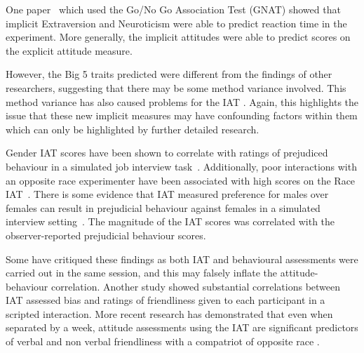 

One paper~\cite{Boldero2007} which used the Go/No Go Association Test (GNAT) showed that implicit Extraversion and Neuroticism were able to predict reaction time in the experiment. More generally, the implicit attitudes were able to predict scores on the explicit attitude measure. 

However, the Big 5 traits predicted were different from the findings of other researchers, suggesting that there may be some method variance involved. This method variance has also caused problems for the IAT \cite{Mierke2003,Greenwald2003a}. Again, this highlights the issue that these new implicit measures may have confounding factors within them which can only be highlighted by further detailed research.



Gender IAT scores have been shown to correlate with ratings of prejudiced behaviour in a simulated job interview task~\cite{Rudman1999a}. Additionally, poor interactions with an opposite race experimenter have been associated with high scores on the Race IAT~\cite{McConnell2001}. 
There is some evidence that IAT measured preference for males over females  can result in prejudicial behaviour against females in a simulated interview setting~\cite{Greenwald2000,Heider2007}. The magnitude of the IAT scores was correlated with the observer-reported prejudicial behaviour scores. 

Some have critiqued these findings as both IAT and behavioural assessments were carried out in the same session, and this may falsely inflate the attitude-behaviour correlation. Another study \cite{McConnell2001} showed substantial correlations between IAT assessed bias and ratings of friendliness given to each participant in a scripted interaction. More recent research has demonstrated that even when separated by a week, attitude assessments using the IAT are significant predictors of verbal and non verbal friendliness with a compatriot of opposite race \cite{Heider2007}. 

